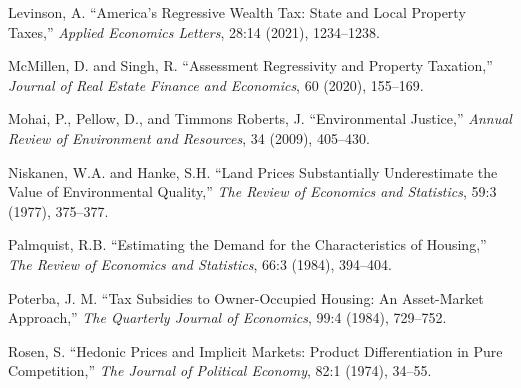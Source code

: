 \documentclass[ecta,nameyear,draft]{econsocart}
\theoremstyle{plain}
\theoremstyle{remark}
\begin{document}
\begin{thebibliography}{}
\textup{Levinson, A.} %
``America's Regressive Wealth Tax: State and Local Property Taxes,''
\textit{Applied Economics Letters}, 28:14 (2021), 1234--1238.
\endbibitem


\textup{McMillen, D. and Singh, R.} %
``Assessment Regressivity and Property Taxation,''
\textit{Journal of Real Estate Finance and Economics}, 60 (2020), 155--169.
\endbibitem

\textup{Mohai, P., Pellow, D., and Timmons Roberts, J.} %
``Environmental Justice,''
\textit{Annual Review of Environment and Resources}, 34 (2009), 405--430.
\endbibitem

\textup{Niskanen, W.A. and Hanke, S.H.} %
``Land Prices Substantially Underestimate the Value of Environmental Quality,''
\textit{The Review of Economics and Statistics}, 59:3 (1977), 375--377.
\endbibitem

\textup{Palmquist, R.B.} %
``Estimating the Demand for the Characteristics of Housing,''
\textit{The Review of Economics and Statistics}, 66:3 (1984), 394--404.
\endbibitem



\textup{Poterba, J. M.} %
``Tax Subsidies to Owner-Occupied Housing: An Asset-Market Approach,''
\textit{The Quarterly Journal of Economics}, 99:4 (1984), 729--752.
\endbibitem

\textup{Rosen, S.} %
``Hedonic Prices and Implicit Markets: Product Differentiation in Pure Competition,''
\textit{The Journal of Political Economy}, 82:1 (1974), 34--55.
\endbibitem


\end{thebibliography}
\end{document}
